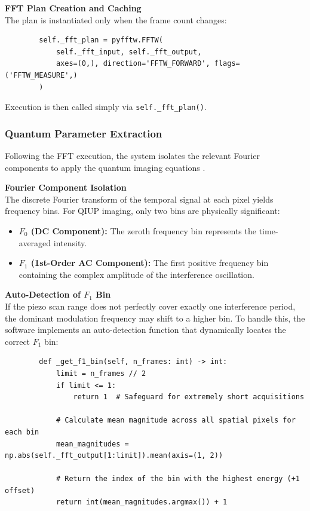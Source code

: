 \documentclass[12pt,a4paper]{article}
\begin{document}
        \textbf{FFT Plan Creation and Caching} \\
        The plan is instantiated only when the frame count changes:
        \begin{verbatim}
        self._fft_plan = pyfftw.FFTW(
            self._fft_input, self._fft_output,
            axes=(0,), direction='FFTW_FORWARD', flags=('FFTW_MEASURE',)
        )
        \end{verbatim}
        Execution is then called simply via \texttt{self.\_fft\_plan()}.

        \subsubsection{Quantum Parameter Extraction}
        Following the \ac{FFT} execution, the system isolates the relevant Fourier components to apply the quantum imaging equations \cite{pearce2023practical}.

        \textbf{Fourier Component Isolation} \\
        The discrete Fourier transform of the temporal signal at each pixel yields frequency bins. For \ac{QIUP} imaging, only two bins are physically significant:
        \begin{itemize}
            \item \textbf{$F_0$ (DC Component):} The zeroth frequency bin represents the time-averaged intensity. 
            \item \textbf{$F_1$ (1st-Order AC Component):} The first positive frequency bin containing the complex amplitude of the interference oscillation.
        \end{itemize}

        \textbf{Auto-Detection of $F_1$ Bin} \\
        If the piezo scan range does not perfectly cover exactly one interference period, the dominant modulation frequency may shift to a higher bin. To handle this, the software implements an auto-detection function that dynamically locates the correct $F_1$ bin:

        \begin{verbatim}
        def _get_f1_bin(self, n_frames: int) -> int:
            limit = n_frames // 2
            if limit <= 1:
                return 1  # Safeguard for extremely short acquisitions
            
            # Calculate mean magnitude across all spatial pixels for each bin
            mean_magnitudes = np.abs(self._fft_output[1:limit]).mean(axis=(1, 2))
            
            # Return the index of the bin with the highest energy (+1 offset)
            return int(mean_magnitudes.argmax()) + 1
        \end{verbatim}
\end{document}
